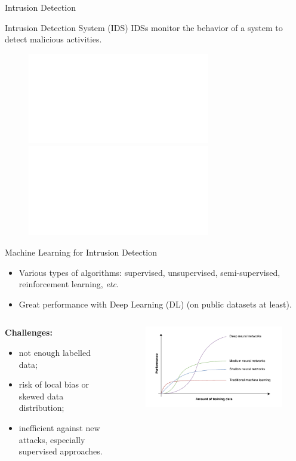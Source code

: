 \begin{frame}[t]{Intrusion Detection}
  \vspace{2em}
  \begin{block}{Intrusion Detection System (IDS)}
    IDSs monitor the behavior of a system to detect malicious activities.
  \end{block}

  \begin{figure}
    \centering
    \includegraphics<2>[width=.75\textwidth]{figures/intro/ids.pdf}
    \includegraphics<3>[width=.75\textwidth]{figures/intro/ids-us.pdf}
  \end{figure}
\end{frame}


\begin{frame}{Machine Learning for Intrusion Detection}

  \begin{itemize}
    \item Various types of algorithms: \alert<2>{supervised}, unsupervised, semi-supervised, reinforcement learning, \textit{etc}.
    \item Great performance with Deep Learning (DL) (on public datasets at least).
  \end{itemize}

  \pause
  \begin{columns}
    \begin{column}{0.5\textwidth}
        \textbf{Challenges:}
        \begin{itemize}
          \item not enough labelled data;
          \item risk of local bias or skewed data distribution;
          \item inefficient against new attacks, especially \alert{supervised} approaches.
        \end{itemize}
    \end{column}

    \begin{column}{0.5\textwidth}
      \begin{figure}
        \centering
        \includegraphics[width=\linewidth]{figures/intro/ml-perf}
      \end{figure}
    \end{column}
  \end{columns}
\end{frame}

